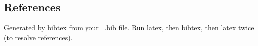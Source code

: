 \documentclass{vldb}
\begin{document}


\subsection{References}
Generated by bibtex from your ~.bib file.  Run latex,
then bibtex, then latex twice (to resolve references).
\end{document}
